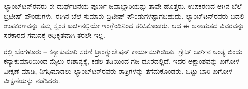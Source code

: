 ಲ್ಯಾಂಬ್​ಟನ್​ರವರು ಈ ದುರ್ಘಟನೆಯ ಪೂರ್ಣ ಜವಾಬ್ದಾರಿಯನ್ನು ತಾವೇ ಹೊತ್ತರು. ಉಪಕರಣದ ಆಗಿನ ಬೆಲೆ  ಬ್ರಿಟೀಷ್​ ಪೌಂಡುಗಳು. ಈಗಿನ ಬೆಲೆ ಸುಮಾರು  ಬ್ರಿಟೀಷ್​ ಪೌಂಡುಗಳಷ್ಟಾಗಬಹುದು. ಲ್ಯಾಂಬ್​ಟನ್​ರವರು ಬದಲಿ ಉಪಕರಣವನ್ನು ತಮ್ಮ ಸ್ವಂತ ಖರ್ಚಿನಲ್ಲಿಯೇ ಇಂಗ್ಲೆಂಡಿನಿಂದ ತರಿಸಿಕೊಂಡರು. ಆದ ಈ ಅನಾಹುತದ ವಿವರವನ್ನು ಸರಕಾರದ ಗಮನಕ್ಕೆ ಅಧಿಕೃತವಾಗಿ ತರಲೇ ಇಲ್ಲ.

ರಲ್ಲಿ ಬೆಂಗಳೂರು – ಕನ್ಯಾಕುಮಾರಿ ಸರಣಿ ಟ್ರಾಂಗ್ಯುಲೇಷನ್​ ಕಾರ್ಯ\break ಮುಗಿಯಿತು. ಗ್ರೇಟ್​ ಆರ್ಕ್‌ನ ಅಂತ್ಯ ಬಿಂದು ಕನ್ಯಾಕುಮಾರಿಯಿಂದ  ಮೈಲು ಈಶಾನ್ಯಕ್ಕೆ, ಕಡಲ ತಡಿಯಿಂದ  ಗಜ ದೂರದಲ್ಲಿದೆ. ಇದರ ಅಕ್ಷಾಂಶವನ್ನು ಖಗೋಳ ವೀಕ್ಷಣೆ ಮಾಡಿ, ನಿಗಧಿಮಾಡಲು ಲ್ಯಾಂಬ್​ಟನ್​ರವರು  ರಾತ್ರಿಗಳನ್ನು ತೆಗೆದುಕೊಂಡರು. ಒಟ್ಟು  ಬಾರಿ ಖಗೋಳ ವೀಕ್ಷಣೆಯನ್ನು ನಡೆಸಿದರು.

